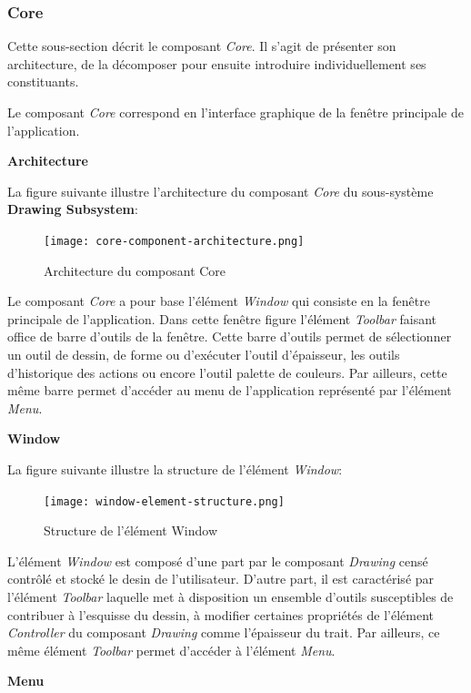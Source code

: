 \documentclass[11pt,a4paper,oldfontcommands]{memoir}
\begin{document}
\subsubsection{Core}

Cette sous-section décrit le composant \textit{Core}. Il s'agit de présenter son architecture, de la décomposer pour ensuite introduire individuellement ses constituants.

Le composant \textit{Core} correspond en l'interface graphique de la fenêtre principale de l'application.

\textbf{Architecture}

La figure suivante illustre l'architecture du composant \textit{Core} du sous-système \textbf{Drawing Subsystem}:

\begin{figure}[H]
\centering
\texttt{[image: core-component-architecture.png]}
\caption{Architecture du composant Core}
\end{figure}

Le composant \textit{Core} a pour base l'élément \textit{Window} qui consiste en la fenêtre principale de l'application. Dans cette fenêtre figure l'élément \textit{Toolbar} faisant office de barre d'outils de la fenêtre. Cette barre d'outils permet de sélectionner un outil de dessin, de forme ou d'exécuter l'outil d'épaisseur, les outils d'historique des actions ou encore l'outil palette de couleurs. Par ailleurs, cette même barre permet d'accéder au menu de l'application représenté par l'élément \textit{Menu}.

\textbf{Window}

La figure suivante illustre la structure de l'élément \textit{Window}:

\begin{figure}[H]
\centering
\texttt{[image: window-element-structure.png]}
\caption{Structure de l'élément Window}
\end{figure}

L'élément \textit{Window} est composé d'une part par le composant \textit{Drawing} censé contrôlé et stocké le desin de l'utilisateur. D'autre part, il est caractérisé par l'élément \textit{Toolbar} laquelle met à disposition un ensemble d'outils susceptibles de contribuer à l'esquisse du dessin, à modifier certaines propriétés de l'élément \textit{Controller} du composant \textit{Drawing} comme l'épaisseur du trait. Par ailleurs, ce même élément \textit{Toolbar} permet d'accéder à l'élément \textit{Menu}.

\textbf{Menu}
\end{document}
